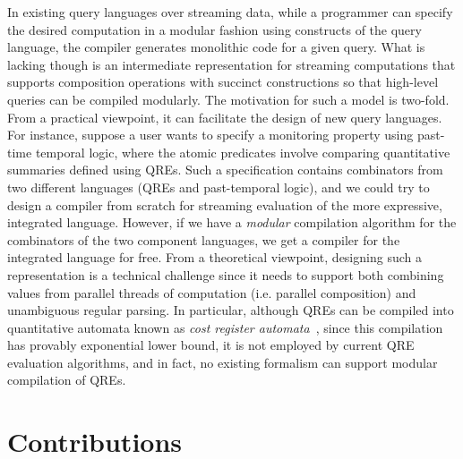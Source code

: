 In existing query languages over streaming data, while a programmer can specify the desired computation
in a modular fashion using constructs of the query language, the compiler generates monolithic code for
a given query.
What is lacking though is an intermediate representation for streaming computations
that supports composition operations with succinct constructions so that high-level queries can be
compiled modularly. The motivation for such a model is two-fold. From a practical viewpoint,
it can facilitate the design of new query languages. For instance, suppose a user wants
to specify a monitoring property using past-time temporal logic, where the atomic
predicates involve comparing quantitative summaries defined using QREs.
Such a specification contains combinators from two different languages (QREs and past-temporal logic), and we could try to design a compiler from scratch for streaming evaluation of the more expressive, integrated language.
However, if we have a \emph{modular} compilation algorithm for the combinators of the two component languages, we get a compiler for the integrated language for free.
From a theoretical viewpoint, designing such a representation is a technical challenge since
it needs to support both combining values from parallel threads of computation (i.e. parallel composition) and unambiguous regular parsing.
In particular, although QREs can be compiled into quantitative automata known
as \emph{cost register automata}~\cite{AdADRY2013CRA}, since this compilation has provably exponential lower bound,
it is not employed by current QRE evaluation algorithms, and in fact, no existing formalism can support
modular compilation of QREs.

\section{Contributions}

